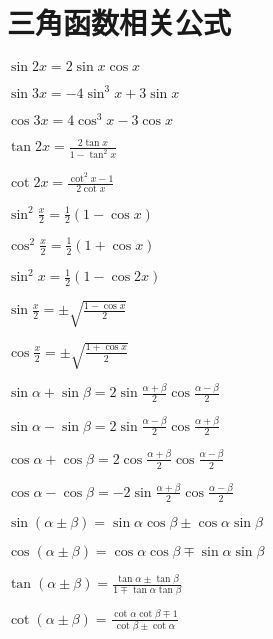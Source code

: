\section{三角函数相关公式}

\begin{spacing}{\hangju}
    \begin{multicols}{2}
        \noindent $\sin{2x}=2\sin{x}\cos{x}$

        \noindent $\sin{3x}=-4\sin^3{x}+3\sin{x}$

        \noindent $\cos{3x}=4\cos^3{x}-3\cos{x}$

        \noindent $\tan{2x}=\frac{2\tan{x}}{1-\tan^2{x}}$

        \noindent $\cot{2x}=\frac{\cot^2{x}-1}{2\cot{x}}$

        \noindent $\sin^2{\frac{x}{2}}=\frac{1}{2}(1-\cos{x})$

        \noindent $\cos^2{\frac{x}{2}}=\frac{1}{2}(1+\cos{x})$

        \noindent $\sin^2{x}=\frac{1}{2}(1-\cos{2x})$

        \noindent $\sin{\frac{x}{2}}=\pm\sqrt{\frac{1-\cos{x}}{2}}$

        \noindent $\cos{\frac{x}{2}}=\pm\sqrt{\frac{1+\cos{x}}{2}}$

        \noindent $\sin{\alpha}+\sin{\beta}=2\sin{\frac{\alpha+\beta}{2}}\cos{\frac{\alpha-\beta}{2}}$

        \noindent $\sin{\alpha}-\sin{\beta}=2\sin{\frac{\alpha-\beta}{2}}\cos{\frac{\alpha+\beta}{2}}$

        \noindent $\cos{\alpha}+\cos{\beta}=2\cos{\frac{\alpha+\beta}{2}}\cos{\frac{\alpha-\beta}{2}}$

        \noindent $\cos{\alpha}-\cos{\beta}=-2\sin{\frac{\alpha+\beta}{2}}\cos{\frac{\alpha-\beta}{2}}$

        \noindent $\sin{(\alpha \pm \beta)}=\sin{\alpha}\cos{\beta} \pm \cos{\alpha}\sin{\beta}$

        \noindent $\cos{(\alpha \pm \beta)}=\cos{\alpha}\cos{\beta} \mp \sin{\alpha}\sin{\beta}$

        \noindent $\tan{(\alpha \pm \beta)}=\frac{\tan{\alpha} \pm \tan{\beta}}{1 \mp \tan{\alpha}\tan{\beta}}$

        \noindent $\cot{(\alpha \pm \beta)}=\frac{\cot{\alpha}\cot{\beta} \mp 1}{\cot{\beta} \pm \cot{\alpha}}$

    \end{multicols}


\end{spacing}
